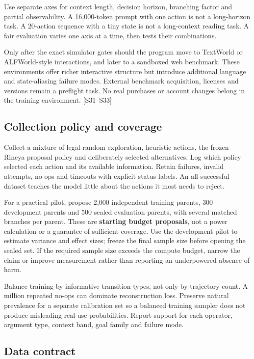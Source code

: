 \documentclass[
  11pt,
  a4paper,
]{article}
\begin{document}
Use separate axes for context length, decision horizon, branching factor
and partial observability. A 16,000-token prompt with one action is not
a long-horizon task. A 20-action sequence with a tiny state is not a
long-context reading task. A fair evaluation varies one axis at a time,
then tests their combinations.

Only after the exact simulator gates should the program move to
TextWorld or ALFWorld-style interactions, and later to a sandboxed web
benchmark. These environments offer richer interactive structure but
introduce additional language and state-aliasing failure modes. External
benchmark acquisition, licenses and versions remain a preflight task. No
real purchases or account changes belong in the training environment.
{[}S31--S33{]}

\subsection{Collection policy and
coverage}\label{collection-policy-and-coverage}

Collect a mixture of legal random exploration, heuristic actions, the
frozen Rineya proposal policy and deliberately selected alternatives.
Log which policy selected each action and its available information.
Retain failures, invalid attempts, no-ops and timeouts with explicit
status labels. An all-successful dataset teaches the model little about
the actions it most needs to reject.

For a practical pilot, propose 2,000 independent training parents, 300
development parents and 500 sealed evaluation parents, with several
matched branches per parent. These are \textbf{starting budget
proposals}, not a power calculation or a guarantee of sufficient
coverage. Use the development pilot to estimate variance and effect
sizes; freeze the final sample size before opening the sealed set. If
the required sample size exceeds the compute budget, narrow the claim or
improve measurement rather than reporting an underpowered absence of
harm.

Balance training by informative transition types, not only by trajectory
count. A million repeated no-ops can dominate reconstruction loss.
Preserve natural prevalence for a separate calibration set so a balanced
training sampler does not produce misleading real-use probabilities.
Report support for each operator, argument type, context band, goal
family and failure mode.

\subsection{Data contract}\label{data-contract}
\end{document}
